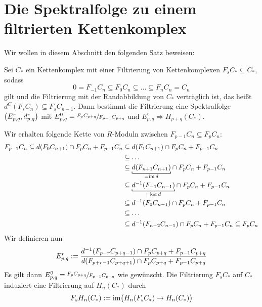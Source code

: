 \section{Die Spektralfolge zu einem filtrierten Kettenkomplex} %
\label{sec:15}

Wir wollen in diesem Abschnitt den folgenden Satz beweisen:
\begin{satz}[{name=[{Spektralfolge zu einem Kettenkomplex mit Filtrierung}]},label=satz:spektralfolge_filtrierung]
	Sei $C_*$ ein Kettenkomplex mit einer Filtrierung von Kettenkomplexen $F_s C_* \subseteq C_*$, sodass
	\[
		0 = F_{-1}C_n \subseteq F_0 C_n \subseteq \ldots \subseteq F_n C_n = C_n
	\]
	gilt und die Filtrierung mit der Randabbildung von $C_*$ verträglich ist, das heißt $d^C (F_s C_n) \subseteq F_s C_{n-1}$.
	Dann bestimmt die Filtrierung eine Spektralfolge $\enbrace*{E^r_{p,q},d^r_{p,q}}$ mit $E_{p,q}^0 = \sfrac{F_p C_{p+q}}{F_{p-1} C_{p+q}}$ und $E^r_{p,q} \Rightarrow H_{p+q}(C_*)$.
\end{satz}

\noindent Wir erhalten folgende Kette von $R$-Moduln zwischen $F_{p-1} C_n \subseteq F_p C_n$:
\begin{align}
	F_{p-1} C_n \subseteq d \enbrace*{F_0 C_{n+1}} \cap F_p C_n + F_{p-1} C_n &\subseteq d \enbrace*{F_1 C_{n+1}}\cap F_p C_n + F_{p-1} C_n \\
	&\subseteq \ldots \\
	&\subseteq \Underbracket{d \enbrace*{F_{n+1} C_{n+1}}}{=\im d} \cap F_p C_n + F_{p-1} C_n \\
	&\subseteq \Underbracket{d^{-1} \enbrace*{F_{-1} C_{n-1}}}{=\ker d} \cap F_p C_n + F_{p-1} C_n \\
	&\subseteq d^{-1}\enbrace*{F_0 C_{n-1}}\cap F_p C_n + F_{p-1} C_n \\
	&\subseteq \ldots  \\
	&\subseteq d^{-1} \enbrace*{F_{n-2}C_{n-1}} \cap F_p C_n + F_{p-1} C_n \subseteq F_p C_n
\end{align}
Wir definieren nun
\[
	E^r_{p,q} := \frac{d^{-1}\enbrace*{F_{p-r} C_{p+q-1}} \cap F_p C_{p+q} + F_{p-1}C_{p+q}}{d \enbrace*{F_{p+r-1} C_{p+q+1}} \cap F_p C_{p+q} + F_{p-1} C_{p+q}}
\]
Es gilt dann $E_{p,q}^0 = \sfrac{F_p C_{p+q}}{F_{p-1} C_{p+q}}$ wie gewünscht.
Die Filtrierung $F_s C_*$ auf $C_*$ induziert eine Filtrierung auf $H_n(C_*)$ durch
\[
	F_s H_n(C_*) := \im \enbrace[\big]{H_n(F_s C_*) \to H_n(C_*)}
\]

